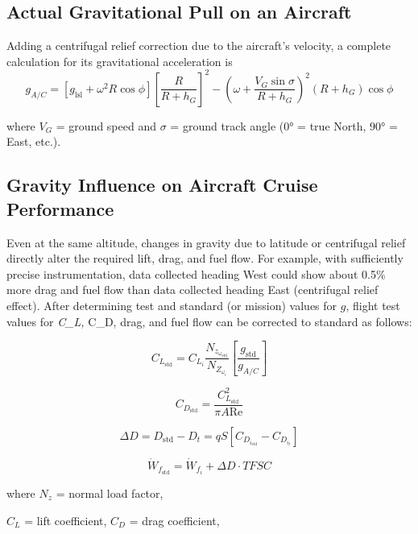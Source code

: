 \documentclass[
]{book}
\begin{document}
\hypertarget{actual-gravitational-pull-on-an-aircraft}{%
\subsection*{Actual Gravitational Pull on an Aircraft}\label{actual-gravitational-pull-on-an-aircraft}}

Adding a centrifugal relief correction due to the aircraft's velocity, a complete calculation for its gravitational acceleration is
\[
g_{A/C} = \left[ g_{\mathrm{lsl}} + \omega^2 R \cos{\phi} \right] \left[ \frac{R}{R + h_G} \right]^2 - \left( \omega + \frac{V_G \sin{\sigma}}{R + h_G} \right)^2 \left(R + h_G\right) \cos{\phi}
\]

where \(V_G\) = ground speed and \(\sigma\) = ground track angle (\(0°\) = true North, \(90°\) = East, etc.).

\hypertarget{gravity-influence-on-aircraft-cruise-performance}{%
\subsection*{Gravity Influence on Aircraft Cruise Performance}\label{gravity-influence-on-aircraft-cruise-performance}}

Even at the same altitude, changes in gravity due to latitude or centrifugal relief directly alter the required lift, drag, and fuel flow. For example, with sufficiently precise instrumentation, data collected heading West could show about 0.5\% more drag and fuel flow than data collected heading East (centrifugal relief effect). After determining test and standard (or mission) values for \(g\), flight test values for \emph{C\_L, }C\_D, drag, and fuel flow can be corrected to standard as follows:

\[C_{L_{\mathrm{std}}} = C_{L_i} \frac{N_{z_{\omega_{\mathrm{std}}}}}{N_{Z_{\omega_i}}} \left[\frac{g_{\mathrm{std}}}{g_{A/C}} \right] \]

\[C_{D_{\mathrm{std}}} = \frac{C^2_{L_{\mathrm{std}}}}{\pi A \text{Re}} \]

\[\Delta D = D_{\mathrm{std}} - D_t = qS\left[C_{D_{i_{\mathrm{std}}}} - C_{D_{i_t}} \right] \]

\[\dot{W}_{f_{\mathrm{std}}} = \dot{W}_{f_i} + \Delta D \cdot TFSC \]

where \(N_z\) = normal load factor,

\(C_L\) = lift coefficient, \(C_D\) = drag coefficient,
\end{document}
